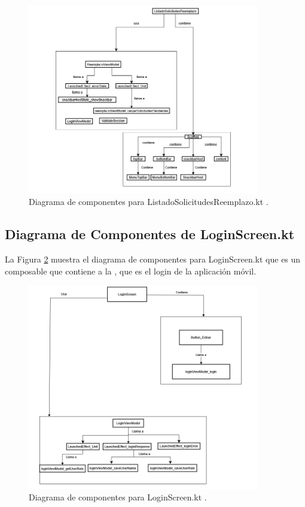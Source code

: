 \begin{figure}[htbp!]
	\begin{center}
		\includegraphics[width=0.9\textwidth]{DiagramasMoviles/DCM (26)}
		\caption{Diagrama de componentes para ListadoSolicitudesReemplazo.kt .}
		\label{fig:Componentes_13}
	\end{center}
\end{figure}

\newpage

\subsection{Diagrama de Componentes de LoginScreen.kt}

La Figura \ref{fig:Componentes_14} muestra el diagrama de componentes para LoginScreen.kt que es un composable que contiene a la , que es el login de la aplicación móvil.

\begin{figure}[htbp!]
	\begin{center}
		\includegraphics[width=0.9\textwidth]{DiagramasMoviles/DCM (27)}
		\caption{Diagrama de componentes para LoginScreen.kt .}
		\label{fig:Componentes_14}
	\end{center}
\end{figure}

